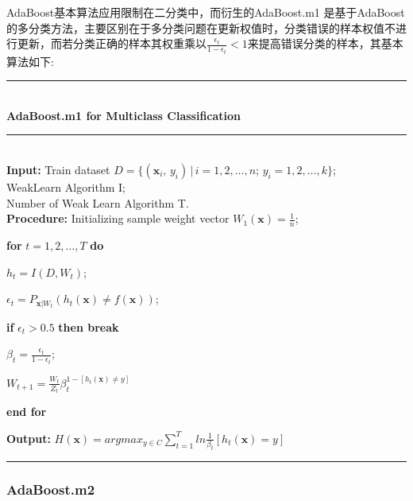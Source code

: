 \documentclass[a4paper]{article}
\begin{document}
			AdaBoost基本算法应用限制在二分类中，而衍生的AdaBoost.m1 是基于AdaBoost的多分类方法，主要区别在于多分类问题在更新权值时，分类错误的样本权值不进行更新，而若分类正确的样本其权重乘以$\frac{\epsilon_t}{1-\epsilon_t}<1$来提高错误分类的样本，其基本算法如下:\par
			\noindent\rule[0.1\baselineskip]{\textwidth}{0.75pt}\\
			\textbf{AdaBoost.m1 for Multiclass Classification}\\
			\noindent\rule[0.1\baselineskip]{\textwidth}{0.5pt}\\
			\textbf{Input:} Train dataset $D = \{(\textbf{x}_i,\,y_i)\,|\,i = 1, 2,\dots, n;\, y_i = 1,2,\dots, k\}$;\\
			\hspace*{32pt} WeakLearn Algorithm I;\\
			\hspace*{32pt} Number of Weak Learn Algorithm T.\\
			\textbf{Procedure:} 
					\hspace*{2pt}Initializing sample weight vector $W_1(\textbf{x}) = \frac{1}{n}$;\par
					\hspace*{32pt} \textbf{for} $t = 1, 2,\dots, T$ \textbf{do}\par
							\hspace*{48pt} $h_t = I(D, W_t)$;\par
							\hspace*{48pt} $\epsilon_t = P_{\textbf{x}|W_t}(h_t(\textbf{x}) \neq f(\textbf{x}))$;\par
							\hspace*{48pt} \textbf{if} $\epsilon_t > 0.5$ \textbf{then break}\par
							\hspace*{48pt} $\beta_t = \frac{\epsilon_t}{1-\epsilon_t}$;\par
							\hspace*{48pt} $W_{t+1} = \frac{W_t}{Z_t}\beta_t^{1-[h_t(\textbf{x})\neq y]}$\par
					\hspace*{32pt}\textbf{end for}\par
			\textbf{Output:} $H(\textbf{x}) = argmax_{y\in C}\sum_{t=1}^{T}ln\frac{1}{\beta_t}[h_t(\textbf{x})=y]$\par
			\noindent\rule[0.1\baselineskip]{\textwidth}{0.75pt}\par

		\subsubsection{AdaBoost.m2}
\end{document}
